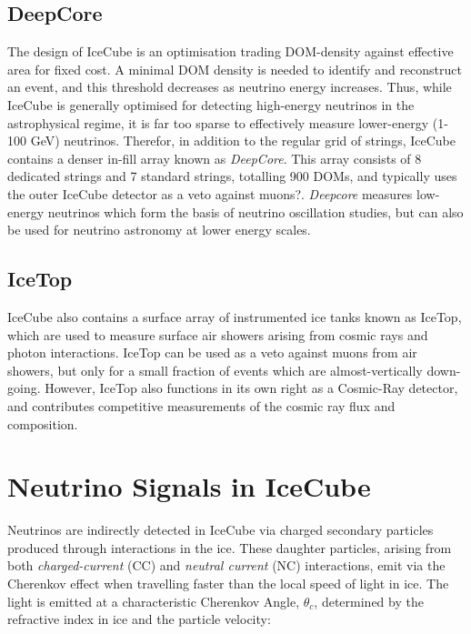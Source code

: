 \subsection*{DeepCore}

The design of IceCube is an optimisation trading DOM-density against effective area for fixed cost. A minimal DOM density is needed to identify and reconstruct an event, and this threshold decreases as neutrino energy increases. Thus, while IceCube is generally optimised for detecting high-energy neutrinos in the astrophysical regime, it is far too sparse to effectively measure lower-energy (1-100 GeV) neutrinos. Therefor, in addition to the regular grid of strings, IceCube contains a denser in-fill array known as \emph{DeepCore}. This array consists of 8 dedicated strings and 7 standard strings, totalling 900 DOMs, and typically uses the outer IceCube detector as a veto against muons?. \textit{Deepcore} measures low-energy neutrinos which form the basis of neutrino oscillation studies, but can also be used for neutrino astronomy at lower energy scales.

\subsection*{IceTop}

IceCube also contains a surface array of instrumented ice tanks known as IceTop, which are used to measure surface air showers arising from cosmic rays and photon interactions. IceTop can be used as a veto against muons from air showers, but only for a small fraction of events which are almost-vertically down-going. However, IceTop also functions in its own right as a Cosmic-Ray detector, and contributes competitive measurements of the cosmic ray flux and composition.

\section{Neutrino Signals in IceCube}
\label{sec:nu_signal}

Neutrinos are indirectly detected in IceCube via charged secondary particles produced through interactions in the ice. These daughter particles, arising from both \emph{charged-current} (CC) and \emph{neutral current} (NC) interactions, emit via the Cherenkov effect when travelling faster than the local speed of light in ice. The light is emitted at a characteristic Cherenkov Angle, $\theta_{c}$, determined by the refractive index in ice and the particle velocity:

